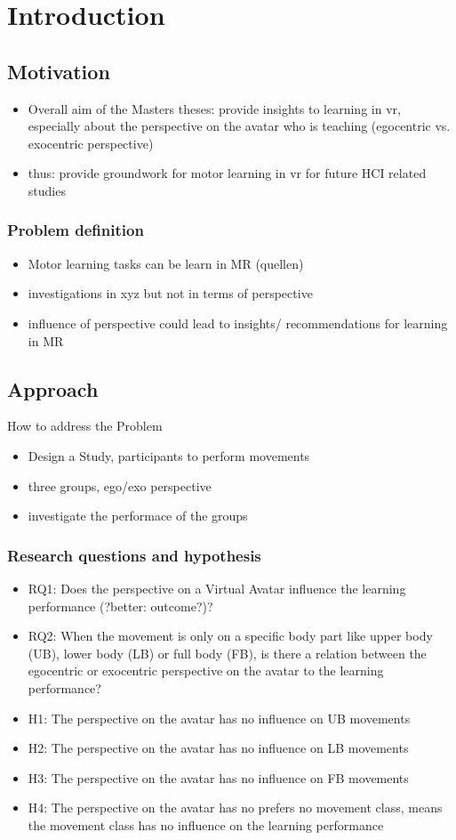 \chapter{Introduction}
\section{Motivation}
\begin{itemize}
	\item Overall aim of the Masters theses: provide insights to learning in vr, especially about the perspective on the avatar who is teaching (egocentric vs. exocentric perspective)	
	\item thus: provide groundwork for motor learning in vr for future HCI related studies
\end{itemize}
\subsection{Problem definition}
\begin{itemize}
	\item Motor learning tasks can be learn in MR (quellen)
	\item investigations in xyz but not in terms of perspective
	\item influence of perspective could lead to insights/ recommendations for learning in MR
\end{itemize}
\section{Approach}
How to address the Problem
\begin{itemize}
	\item Design a Study, participants to perform movements
	\item three groups, ego/exo perspective
	\item investigate the performace of the groups
\end{itemize}
\subsection{Research questions and hypothesis}
\begin{itemize}
	\item RQ1: Does the perspective on a Virtual Avatar influence the learning performance (?better: outcome?)?
	\item RQ2: When the movement is only on a specific body part like upper body (UB), lower body (LB) or full body (FB), is there a relation between the egocentric or exocentric perspective on the avatar to the learning performance?
	\item H1: The perspective on the avatar has no influence on UB movements
	\item H2: The perspective on the avatar has no influence on LB movements
	\item H3: The perspective on the avatar has no influence on FB movements
	\item H4: The perspective on the avatar has no prefers no movement class, means the movement class has no influence on the learning performance 
\end{itemize}
	
